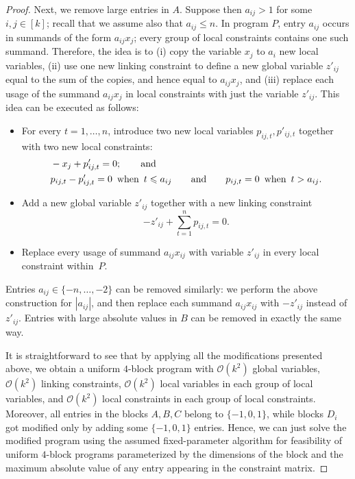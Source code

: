\documentclass{article}
\renewcommand{\leq}{\leqslant}
\newcommand{\Oh}{{\mathcal{O}}}
\begin{document}
\begin{proof}
    Next, we remove large entries in $A$. Suppose then $a_{ij}>1$ for some $i,j\in [k]$; recall that we assume also that $a_{ij}\leq n$. In program $P$, entry $a_{ij}$ occurs in summands of the form $a_{ij}x_j$; every group of local constraints contains one such summand. Therefore, the idea is to (i) copy the variable $x_j$ to $a_i$ new local variables, (ii) use one new linking constraint to define a new global variable $z'_{ij}$ equal to the sum of the copies, and hence equal to $a_{ij}x_j$, and (iii) replace each usage of the summand $a_{ij}x_j$ in local constraints with just the variable $z'_{ij}$. This idea can be executed as follows:
    \begin{itemize}[nosep]
        \item[(i)] For every $t=1,\ldots,n$, introduce two new local variables $p_{ij,t},p'_{ij,t}$ together with two new local constraints:
        \begin{align*}
         & -x_j+p'_{ij,t}=0;\qquad \textrm{and}\\
         & p_{ij,t}-p'_{ij,t}=0\textrm{\, when \,}t\leq a_{ij}\qquad \textrm{and}\qquad p_{ij,t}=0 \textrm{\, when \,} t>a_{ij}.
        \end{align*}
        \item[(ii)] Add a new global variable $z'_{ij}$ together with a new linking constraint $$-z'_{ij}+\sum_{t=1}^n p_{ij,t}=0.$$
        \item[(iii)] Replace every usage of summand $a_{ij}x_{ij}$ with variable $z'_{ij}$ in every local constraint within~$P$.
    \end{itemize}

    Entries $a_{ij}\in \{-n,\ldots,-2\}$ can be removed similarly: we perform the above construction for $|a_{ij}|$, and then replace each summand $a_{ij}x_{ij}$ with $-z'_{ij}$ instead of $z'_{ij}$. Entries with large absolute values in $B$ can be removed in exactly the same way.

    It is straightforward to see that by applying all the modifications presented above, we obtain a uniform $4$-block program with $\Oh(k^2)$ global variables, $\Oh(k^2)$ linking constraints, $\Oh(k^2)$ local variables in each group of local variables, and $\Oh(k^2)$ local constraints in each group of local constraints. Moreover, all entries in the blocks $A,B,C$ belong to $\{-1,0,1\}$, while blocks $D_i$ got modified only by adding some $\{-1,0,1\}$ entries. Hence, we can just solve the modified program using the assumed fixed-parameter algorithm for feasibility of uniform $4$-block programs parameterized by the dimensions of the block and the maximum absolute value of any entry appearing in the constraint matrix.
\end{proof}
\end{document}
